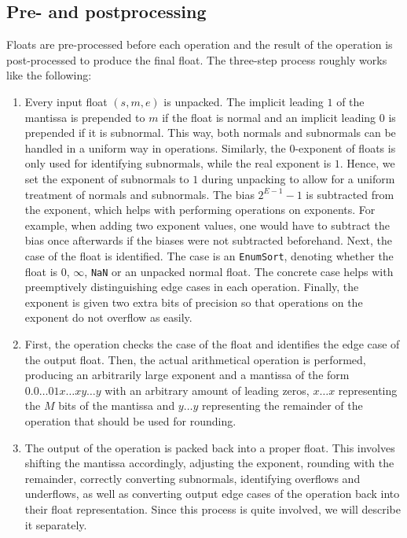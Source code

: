 \documentclass[a4paper,UKenglish,cleveref, autoref, thm-restate]{lipics-v2019}
\begin{document}
\subsection{Pre- and postprocessing}
Floats are pre-processed before each operation and the result of the operation is post-processed to produce the final float. The three-step process roughly works like the following:
\begin{enumerate}
	\item Every input float $(s, m, e)$ is unpacked. The implicit leading $1$ of the mantissa is prepended to $m$ if the float is normal and an implicit leading $0$ is prepended if it is subnormal. This way, both normals and subnormals can be handled in a uniform way in operations. Similarly, the $0$-exponent of floats is only used for identifying subnormals, while the real exponent is $1$. Hence, we set the exponent of subnormals to $1$ during unpacking to allow for a uniform treatment of normals and subnormals. The bias $2^{E-1} - 1$ is subtracted from the exponent, which helps with performing operations on exponents. For example, when adding two exponent values, one would have to subtract the bias once afterwards if the biases were not subtracted beforehand. Next, the case of the float is identified. The case is an \verb|EnumSort|, denoting whether the float is $0$, $\infty$, \verb|NaN| or an unpacked normal float. The concrete case helps with preemptively distinguishing edge cases in each operation. Finally, the exponent is given two extra bits of precision so that operations on the exponent do not overflow as easily.
	\item First, the operation checks the case of the float and identifies the edge case of the output float. Then, the actual arithmetical operation is performed, producing an arbitrarily large exponent and a mantissa of the form $0.0\dots01x\dots xy\dots y$ with an arbitrary amount of leading zeros, $x \dots x$ representing the $M$ bits of the mantissa and $y \dots y$ representing the remainder of the operation that should be used for rounding.
	\item The output of the operation is packed back into a proper float. This involves shifting the mantissa accordingly, adjusting the exponent, rounding with the remainder, correctly converting subnormals, identifying overflows and underflows, as well as converting output edge cases of the operation back into their float representation. Since this process is quite involved, we will describe it separately.
\end{enumerate}
\end{document}
